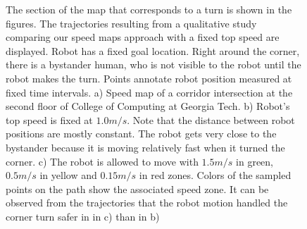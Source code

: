 \begin{figure}[ht!]
    \caption{The section of the map that corresponds to a turn is shown in the figures. The trajectories resulting from a qualitative study comparing our speed maps approach with a fixed top speed are displayed. Robot has a fixed goal location. Right around the corner, there is a bystander human, who is not visible to the robot until the robot makes the turn. Points annotate robot position measured at fixed time intervals. a) Speed map of a corridor intersection at the second floor of College of Computing at Georgia Tech. b) Robot's top speed is fixed at $1.0m/s$. Note that the distance between robot positions are mostly constant. The robot gets very close to the bystander because it is moving relatively fast when it turned the corner. c) The robot is allowed to move with $1.5m/s$ in green, $0.5m/s$ in yellow and $0.15m/s$ in red zones. Colors of the sampled points on the path show the associated speed zone. It can be observed from the trajectories that the robot motion handled the corner turn safer in in c) than in b)}
   \label{fig:nav_speed_map_results}
\end{figure}

